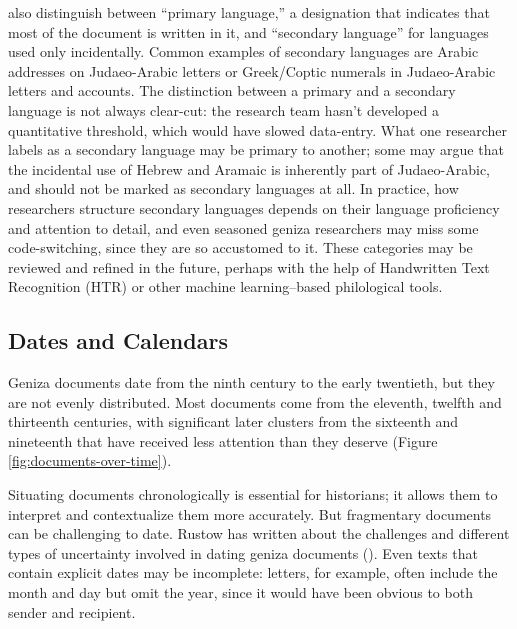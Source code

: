 \documentclass{article}
\begin{document}
 also distinguish between “primary language,” a designation that indicates that most of the document is written in it, and “secondary language” for languages used only incidentally. Common examples of secondary languages are Arabic addresses on Judaeo-Arabic letters or Greek/Coptic numerals in Judaeo-Arabic letters and accounts. The distinction between a primary and a secondary language is not always clear-cut: the research team hasn't developed a quantitative threshold, which would have slowed data-entry. What one researcher labels as a secondary language may be primary to another; some may argue that the incidental use of Hebrew and Aramaic is inherently part of Judaeo-Arabic, and should not be marked as secondary languages at all. In practice, how researchers structure secondary languages depends on their language proficiency and attention to detail, and even seasoned geniza researchers may miss some code-switching, since they are so accustomed to it. These categories may be reviewed and refined in the future, perhaps with the help of Handwritten Text Recognition (HTR) or other machine learning–based philological tools.

\subsection{Dates and Calendars}

Geniza documents date from the ninth century to the early twentieth, but they are not evenly distributed. Most documents come from the eleventh, twelfth and thirteenth centuries, with significant later clusters from the sixteenth and nineteenth that have received less attention than they deserve (Figure \ref{fig:documents-over-time}).

Situating documents chronologically is essential for historians; it allows them to interpret and contextualize them more accurately. But fragmentary documents can be challenging to date. Rustow has written about the challenges and different types of uncertainty involved in dating geniza documents (\citeyear{rustow_dating_2020}). Even texts that contain explicit dates may be incomplete: letters, for example, often include the month and day but omit the year, since it would have been obvious to both sender and recipient. 
\end{document}
